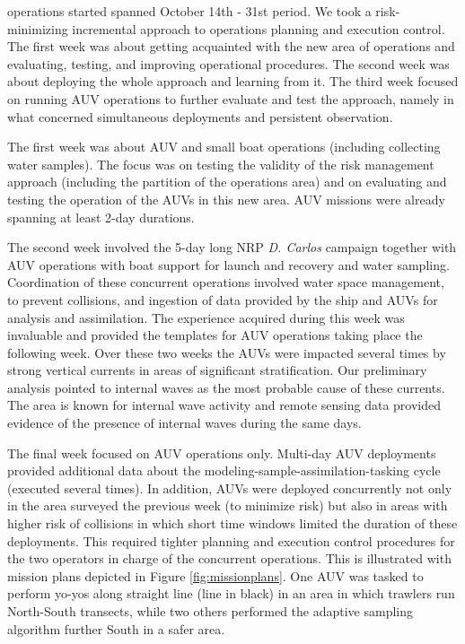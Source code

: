 \proj operations started spanned October 14th - 31st period. We took a
risk-minimizing incremental approach to operations planning and
execution control. The first week was about getting acquainted with the
new area of operations and evaluating, testing, and improving
operational procedures. The second week was about deploying the whole
approach and learning from it. The third week focused on running AUV
operations to further evaluate and test the approach, namely in what
concerned simultaneous deployments and persistent observation.

The first week was about AUV and small boat operations (including
collecting water samples). The focus was on testing the validity of the
risk management approach (including the partition of the operations
area) and on evaluating and testing the operation of the AUVs in this
new area. AUV missions were already spanning at least 2-day durations.

The second week involved the 5-day long NRP \emph{D. Carlos} campaign
together with AUV operations with boat support for launch and recovery
and water sampling. Coordination of these concurrent operations involved
water space management, to prevent collisions, and ingestion of data
provided by the ship and AUVs for analysis and assimilation. The
experience acquired during this week was invaluable and provided the
templates for AUV operations taking place the following week. Over these
two weeks the AUVs were impacted several times by strong vertical
currents in areas of significant stratification. Our preliminary
analysis pointed to internal waves as the most probable cause of these
currents. The area is known for internal wave activity and remote
sensing data provided evidence of the presence of internal waves during
the same days.

The final week focused on AUV operations only. Multi-day AUV deployments
provided additional data about the modeling-sample-assimilation-tasking
cycle (executed several times). In addition, AUVs were deployed
concurrently not only in the area surveyed the previous week (to
minimize risk) but also in areas with higher risk of collisions in which
short time windows limited the duration of these deployments. This
required tighter planning and execution control procedures for the two
operators in charge of the concurrent operations. This is illustrated
with mission plans depicted in Figure \ref{fig:missionplans}. One AUV
was tasked to perform yo-yos along straight line (line in black) in an
area in which trawlers run North-South transects, while two others
performed the adaptive sampling algorithm further South in a safer area.
 
